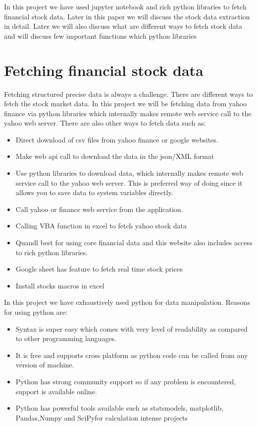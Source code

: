 \indent
In this project we have used jupyter notebook and rich python libraries to fetch financial stock data. Later in this paper we will discuss the stock data 
extraction in detail. Later we will also discuss what are different ways to fetch stock data and will discuss few important functions which python libraries 
 
\section{Fetching financial stock data}

Fetching structured precise data is always a challenge. There are different ways to fetch the stock market data. In this project we will be fetching data from yahoo finance via python libraries which internally makes 
remote web service call to the yahoo web server. There are also other ways to fetch data such as:

\begin{itemize}
  \item Direct download of csv files from yahoo finance or google websites.
  \item Make web api call to download the data in the json/XML format
  \item Use python libraries to download data, which internally makes remote web service call to the yahoo web server. This is preferred way of doing since it allows you to save data to system variables directly. 
  \item Call yahoo or finance web service from the application. 
  \item Calling VBA function in excel to fetch yahoo stock data 
  \item Quandl best for using core financial data and this website also includes access to rich python libraries. 
  \item Google sheet has feature to fetch real time stock prices
  \item Install stocks macros in excel 
\end{itemize}

In this project we have exhaustively used python for data manipulation. Reasons for using python are:

\begin{itemize}
  \item Syntax is super easy which comes with very level of readability as compared to other programming languages.
  \item It is free and supports cross platform as python code can be called from any version of machine.
  \item Python has strong community support so if any problem is encountered, support is available online. 
  \item Python has powerful tools available such as statsmodels, matplotlib, Pandas,Numpy and SciPyfor calculation intense projects
\end{itemize}

